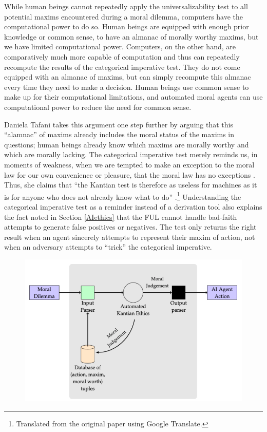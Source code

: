 \begin{isabellebody}
\begin{isamarkuptext}
While human beings cannot repeatedly apply the universalizability test to all potential maxims encountered during 
a moral dilemma, computers have the computational power to do so. Human beings are 
equipped with enough prior knowledge or common sense, to have an almanac of morally worthy maxims,
but we have limited computational power. Computers, on the other hand, are comparatively
much more capable of computation and thus can repeatedly recompute the results of the categorical
imperative test. They do not come equipped with an almanac of maxims, but can simply recompute this
almanac every time they need to make a decision. Human beings use common sense to make up for their computational
limitations, and automated moral agents can use computational power to reduce the need for common sense.

Daniela Tafani takes this argument one step further by arguing that this ``alamnac'' of maxims already 
includes the moral status of the maxims in questions; human beings already
know which maxims are morally worthy and which are morally lacking. The categorical imperative test
merely reminds us, in moments of weakness, when we are tempted to make an exception to the moral law for 
our own convenience or pleasure, that the moral law has no exceptions \citep[9]{tafani}. Thus, she claims
that ``the Kantian test is therefore as useless for machines as it is for anyone who does
not already know what to do'' \citep[8]{tafani}.\footnote{Translated from the original paper using Google Translate.} 
Understanding the categorical imperative test as a reminder
instead of a derivation tool also explains the fact noted in Section \ref{AIethics} that the FUL cannot 
handle bad-faith attempts to generate false positives or negatives. The test only returns the right 
result when an agent sincerely attempts to represent their maxim of action, not when an adversary attempts
 to ``trick'' the categorical imperative.%
\end{isamarkuptext}\isamarkuptrue%
%
\begin{figure}
\centering
\includegraphics[scale=0.5]{inputparser.png}

\end{figure}
\end{isabellebody}
